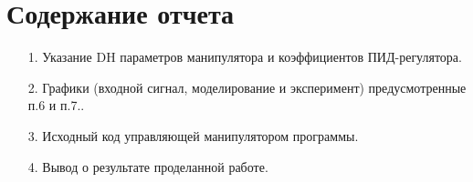  \section{Содержание отчета\\}
 
 \begin{enumerate} 
\item[1.] Указание DH параметров манипулятора и коэффициентов ПИД-регулятора.
\item[2.] Графики (входной сигнал, моделирование и эксперимент) предусмотренные п.6 и п.7..
\item[3.] Исходный код управляющей манипулятором программы.
\item[4.] Вывод о результате проделанной работе.
 \end{enumerate}